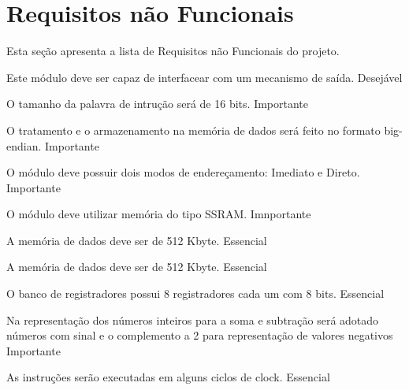 \documentclass{article}
\begin{document}
	
	
	
	    
	
	      
	
	 
	
		  
	 \section{Requisitos não Funcionais}
	  Esta seção apresenta a lista de Requisitos não Funcionais do projeto.
	  
	  \begin{nonfunctional}
	  	
	  {Este módulo deve ser capaz de interfacear com um mecanismo de saída.}
	  {Desejável}
	  
	  {O tamanho da palavra de intrução será de 16 bits.}
	  {Importante}
	  
        {O tratamento e o armazenamento na memória de dados será feito no formato big-endian.}
        {Importante}
        
        {O módulo deve possuir dois modos de endereçamento: Imediato e Direto.}
        {Importante}
        
        {O módulo deve utilizar memória do tipo SSRAM.}
        {Imnportante}
        
        {A memória de dados deve ser de 512 Kbyte.}
        {Essencial}
        
        {A memória de dados deve ser de 512 Kbyte.}
        {Essencial}
        
        {O banco de registradores possui 8 registradores cada um
com 8 bits.}
        {Essencial}
	  
		{Na representação dos números inteiros para a soma e subtração será adotado números com sinal e o complemento a 2 para representação de valores negativos}
		{Importante}
		
		{As instruções serão executadas em alguns ciclos de clock.}
		{Essencial}		
			  
	  \end{nonfunctional}
	  
	
\end{document}
